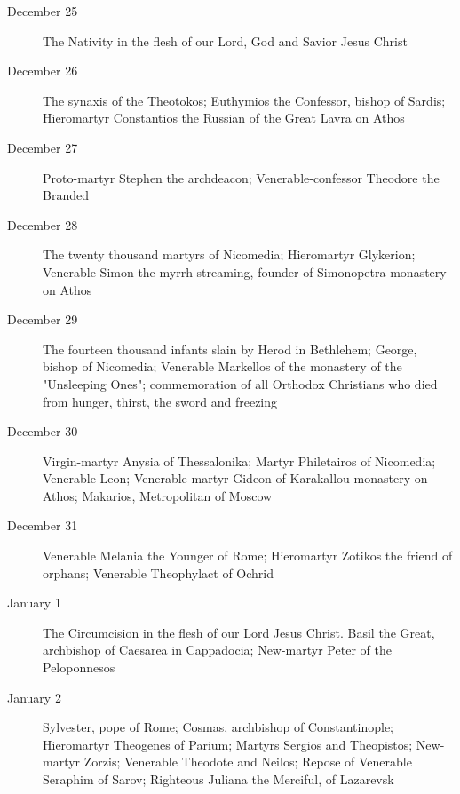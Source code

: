 \begin{description}
\item[December 25]

The Nativity in the flesh of our Lord, God and Savior Jesus Christ

\item[December 26]

The synaxis of the Theotokos; Euthymios the Confessor, bishop of Sardis; Hieromartyr Constantios the Russian of the Great Lavra on Athos

\item[December 27]

Proto-martyr Stephen the archdeacon; Venerable-confessor Theodore the Branded

\item[December 28]

The twenty thousand martyrs of Nicomedia; Hieromartyr Glykerion; Venerable Simon the myrrh-streaming, founder of Simonopetra monastery on Athos

\item[December 29]

The fourteen thousand infants slain by Herod in Bethlehem; George, bishop of Nicomedia; Venerable Markellos of the monastery of the "Unsleeping Ones"; commemoration of all Orthodox Christians who died from hunger, thirst, the sword and freezing

\item[December 30]

Virgin-martyr Anysia of Thessalonika; Martyr Philetairos of Nicomedia; Venerable Leon; Venerable-martyr Gideon of Karakallou monastery on Athos; Makarios, Metropolitan of Moscow

\item[December 31]

Venerable Melania the Younger of Rome; Hieromartyr Zotikos the friend of orphans; Venerable Theophylact of Ochrid

\item[January 1]

The Circumcision in the flesh of our Lord Jesus Christ. Basil the Great, archbishop of Caesarea in Cappadocia; New-martyr Peter of the Peloponnesos

\item[January 2]

Sylvester, pope of Rome; Cosmas, archbishop of Constantinople; Hieromartyr Theogenes of Parium; Martyrs Sergios and Theopistos; New-martyr Zorzis; Venerable Theodote and Neilos; Repose of Venerable Seraphim of Sarov; Righteous Juliana the Merciful, of Lazarevsk


\end{description}
